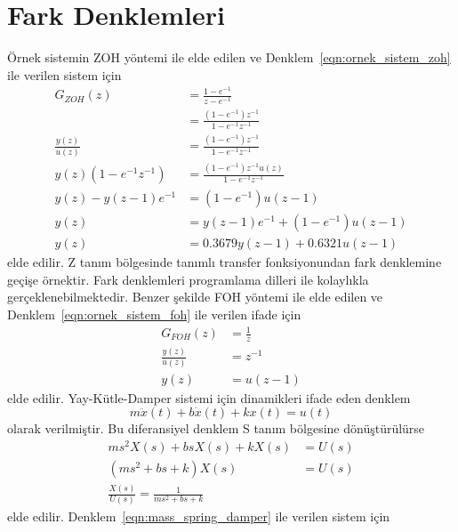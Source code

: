 \chapter{Fark Denklemleri}
Örnek sistemin ZOH yöntemi ile elde edilen ve Denklem~\ref{eqn:ornek_sistem_zoh} ile verilen sistem için
\begin{equation}
\begin{split}
    G_{ZOH}(z)&=\frac{1-e^{-1}}{z-e^{-1}}\\
    &=\frac{(1-e^{-1})z^{-1}}{1-e^{-1}z^{-1}}\\
    \frac{y(z)}{u(z)}&=\frac{(1-e^{-1})z^{-1}}{1-e^{-1}z^{-1}}\\
    y(z)(1-e^{-1}z^{-1})&=\frac{(1-e^{-1})z^{-1}u(z)}{1-e^{-1}z^{-1}}\\
    y(z)-y(z-1)e^{-1}&=(1-e^{-1})u(z-1)\\
    y(z)&=y(z-1)e^{-1}+(1-e^{-1})u(z-1)\\
    y(z)&=0.3679y(z-1)+0.6321u(z-1)
\end{split}
\end{equation}
elde edilir. Z tanım bölgesinde tanımlı transfer fonksiyonundan fark denklemine geçişe örnektir. Fark denklemleri programlama dilleri ile kolaylıkla gerçeklenebilmektedir.
Benzer şekilde FOH yöntemi ile elde edilen ve Denklem~\ref{eqn:ornek_sistem_foh} ile verilen ifade için
\begin{equation}
    \begin{split}
        G_{FOH}(z)&=\frac{1}{z}\\
        \frac{y(z)}{u(z)}&=z^{-1}\\
        y(z)&=u(z-1)
    \end{split}
\end{equation}
elde edilir.
Yay-Kütle-Damper sistemi için dinamikleri ifade eden denklem
\begin{equation}
    m\ddot{x}(t)+b\dot{x}(t)+kx(t)=u(t)\label{eqn:mass_spring_damper}
\end{equation}
olarak verilmiştir. Bu diferansiyel denklem S tanım bölgesine dönüştürülürse
\begin{equation}
\begin{split}
    ms^2X(s)+b sX(s)+kX(s)&=U(s)\\
    (ms^2+b s+k)X(s)&=U(s)\\
    \frac{X(s)}{U(s)}=\frac{1}{ms^2+b s+k}
\end{split}
\end{equation}
elde edilir. Denklem~\ref{eqn:mass_spring_damper} ile verilen sistem için 
